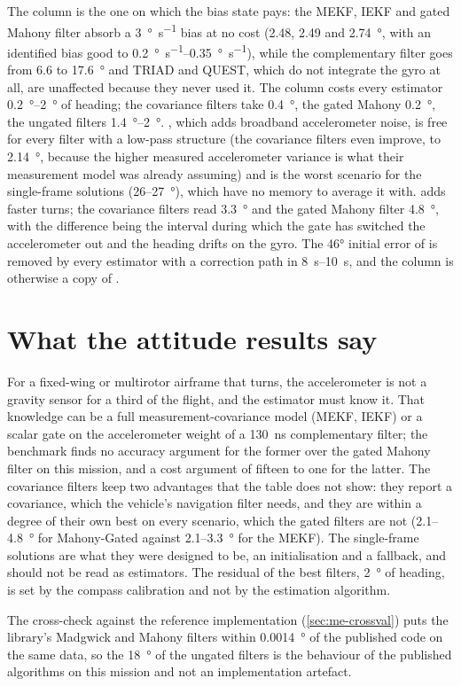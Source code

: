 The  column is the one on which the bias state pays: the MEKF, IEKF and gated
Mahony filter absorb a \SI{3}{\degree\per\second} bias at no cost (\num{2.48}, \num{2.49} and
\SI{2.74}{\degree}, with an identified bias good to \SIrange{0.2}{0.35}{\degree\per\second}),
while the complementary filter goes from \num{6.6} to \SI{17.6}{\degree} and TRIAD and QUEST,
which do not integrate the gyro at all, are unaffected because they never used it. The
 column costs every estimator \SIrange{0.2}{2}{\degree} of heading; the
covariance filters take \SI{0.4}{\degree}, the gated Mahony \SI{0.2}{\degree}, the ungated filters
\SIrange{1.4}{2}{\degree}. , which adds broadband accelerometer noise, is free
for every filter with a low-pass structure (the covariance filters even improve, to
\SI{2.14}{\degree}, because the higher measured accelerometer variance is what their
measurement model was already assuming) and is the worst scenario for the single-frame
solutions (\num{26}--\SI{27}{\degree}), which have no memory to average it with.
 adds faster turns; the covariance filters read \SI{3.3}{\degree} and the
gated Mahony filter \SI{4.8}{\degree}, with the difference being the interval during which the
gate has switched the accelerometer out and the heading drifts on the gyro. The \ang{46}
initial error of  is removed by every estimator with a correction path in
\SIrange{8}{10}{\second}, and the column is otherwise a copy of .

\section{What the attitude results say}

For a fixed-wing or multirotor airframe that turns, the accelerometer is not a gravity sensor
for a third of the flight, and the estimator must know it. That knowledge can be a full
measurement-covariance model (MEKF, IEKF) or a scalar gate on the accelerometer weight of a
\SI{130}{\nano\second} complementary filter; the benchmark finds no accuracy argument for the
former over the gated Mahony filter on this mission, and a cost argument of fifteen to one for
the latter. The covariance filters keep two advantages that the table does not show: they
report a covariance, which the vehicle's navigation filter needs, and they are within a degree
of their own best on every scenario, which the gated filters are not (\num{2.1}--\SI{4.8}{\degree}
for Mahony-Gated against \num{2.1}--\SI{3.3}{\degree} for the MEKF). The single-frame
solutions are what they were designed to be, an initialisation and a fallback, and should not
be read as estimators. The residual of the best filters, \SI{2}{\degree} of heading, is set by
the compass calibration and not by the estimation algorithm.

The cross-check against the  reference implementation (\cref{sec:me-crossval}) puts
the library's Madgwick and Mahony filters within \SI{0.0014}{\degree} of the published code on the
same data, so the \SI{18}{\degree} of the ungated filters is the behaviour of the published
algorithms on this mission and not an implementation artefact.
